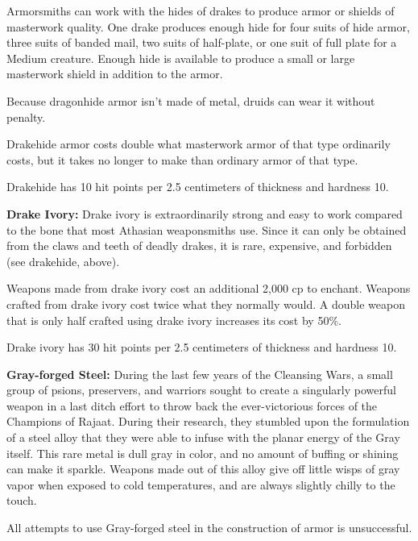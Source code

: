 Armorsmiths can work with the hides of drakes to produce armor or shields of masterwork quality. One drake produces enough hide for four suits of hide armor, three suits of banded mail, two suits of half-plate, or one suit of full plate for a Medium creature. Enough hide is available to produce a small or large masterwork shield in addition to the armor.

Because dragonhide armor isn't made of metal, druids can wear it without penalty.

Drakehide armor costs double what masterwork armor of that type ordinarily costs, but it takes no longer to make than ordinary armor of that type.

Drakehide has 10 hit points per 2.5 centimeters of thickness and hardness 10.

\textbf{Drake Ivory:} Drake ivory is extraordinarily strong and easy to work compared to the bone that most Athasian weaponsmiths use. Since it can only be obtained from the claws and teeth of deadly drakes, it is rare, expensive, and forbidden (see drakehide, above).

Weapons made from drake ivory cost an additional 2,000 cp to enchant. Weapons crafted from drake ivory cost twice what they normally would. A double weapon that is only half crafted using drake ivory increases its cost by 50\%.

Drake ivory has 30 hit points per 2.5 centimeters of thickness and hardness 10.


\textbf{Gray-forged Steel:} During the last few years of the Cleansing Wars, a small group of psions, preservers, and warriors sought to create a singularly powerful weapon in a last ditch effort to throw back the ever-victorious forces of the Champions of Rajaat. During their research, they stumbled upon the formulation of a steel alloy that they were able to infuse with the planar energy of the Gray itself. This rare metal is dull gray in color, and no amount of buffing or shining can make it sparkle. Weapons made out of this alloy give off little wisps of gray vapor when exposed to cold temperatures, and are always slightly chilly to the touch.

All attempts to use Gray-forged steel in the construction of armor is unsuccessful.

